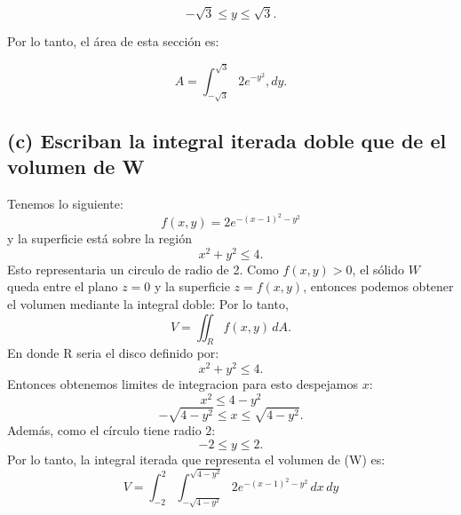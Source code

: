 \begin{respuesta}
\[
-\sqrt{3}\leq y\leq\sqrt{3}.
\]

Por lo tanto, el área de esta sección es:

\[
A=\int_{-\sqrt{3}}^{\sqrt{3}}2e^{-y^2},dy.
\]
\subsection*{(c) Escriban la integral iterada doble que de el volumen de W}

Tenemos lo siguiente: 
\[
f(x,y)=2e^{-(x-1)^2-y^2}
\]
y la superficie está sobre la región
\[
x^2+y^2\leq 4.
\]
Esto representaria un circulo de radio de 2.
Como \(f(x,y)>0\), el sólido \(W\) queda entre el plano \(z=0\) y la superficie
\(z=f(x,y)\), entonces podemos obtener el volumen mediante la integral doble:
Por lo tanto,
\[
V=\iint_R f(x,y)\,dA.
\]
En donde R seria el disco definido por:
\[
x^2+y^2\leq4.
\]
Entonces obtenemos limites de integracion para esto despejamos \(x\):
\[
x^2\leq4-y^2
\]
\[
-\sqrt{4-y^2}\leq x\leq\sqrt{4-y^2}.
\]
Además, como el círculo tiene radio \(2\):
\[
-2\leq y\leq2.
\]
Por lo tanto, la integral iterada que representa el volumen de (W) es:
\[
{
V=
\int_{-2}^{2}
\int_{-\sqrt{4-y^2}}^{\sqrt{4-y^2}}
2e^{-(x-1)^2-y^2}
\,dx\,dy
}
\]
\end{respuesta}
